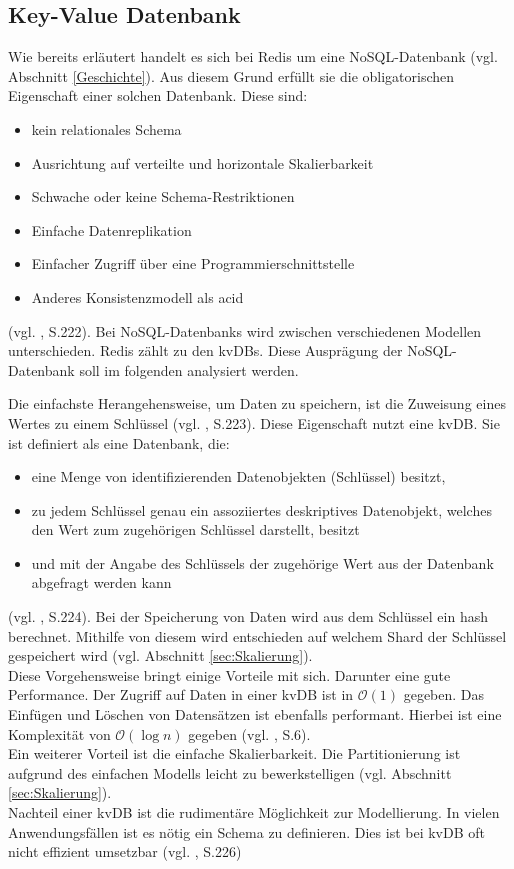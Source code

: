 
\subsection{Key-Value Datenbank}
Wie bereits erläutert handelt es sich bei \acs{Redis} um eine \acs{NoSQL-Datenbank} (vgl. Abschnitt \ref{Geschichte}). Aus diesem Grund erfüllt sie die obligatorischen Eigenschaft einer solchen Datenbank. Diese sind: 
\begin{itemize}
	\item kein relationales Schema
	\item Ausrichtung auf verteilte und horizontale Skalierbarkeit 
	\item Schwache oder keine Schema-Restriktionen 
	\item Einfache Datenreplikation 
	\item Einfacher Zugriff über eine Programmierschnittstelle
	\item Anderes Konsistenzmodell als \gls{acid}
\end{itemize}
(vgl. \cite{1}, S.222). Bei \acp{NoSQL-Datenbank} wird zwischen verschiedenen Modellen unterschieden. \acs{Redis} zählt zu den \glspl{kvDB}. Diese Ausprägung der \acs{NoSQL-Datenbank} soll im folgenden analysiert werden. 

Die einfachste Herangehensweise, um Daten zu speichern, ist die Zuweisung eines Wertes zu einem Schlüssel (vgl. \cite{1}, S.223). Diese Eigenschaft nutzt eine \gls{kvDB}. Sie ist definiert als eine Datenbank, die:
\begin{itemize}
	\item  eine Menge von identifizierenden Datenobjekten (Schlüssel) besitzt,
	\item  zu jedem Schlüssel genau ein assoziiertes deskriptives Datenobjekt, welches den Wert zum zugehörigen Schlüssel darstellt, besitzt
	\item und mit der Angabe des Schlüssels der zugehörige Wert aus der Datenbank abgefragt werden kann
\end{itemize}
(vgl. \cite{1}, S.224). Bei der Speicherung von Daten wird aus dem Schlüssel ein \gls{hash} berechnet. Mithilfe von diesem wird entschieden auf welchem Shard der Schlüssel gespeichert wird (vgl. Abschnitt \ref{sec:Skalierung}).
\\Diese Vorgehensweise bringt einige Vorteile mit sich. Darunter eine gute Performance. Der Zugriff auf Daten in einer \gls{kvDB} ist in $\mathcal{O}(1)$ gegeben. Das Einfügen und Löschen von Datensätzen ist ebenfalls performant. Hierbei ist eine Komplexität von $\mathcal{O}(\log{}n)$ gegeben (vgl. \cite{keyValueComp}, S.6). 
\\Ein weiterer Vorteil ist die einfache Skalierbarkeit. Die Partitionierung ist aufgrund des einfachen Modells leicht zu bewerkstelligen (vgl. Abschnitt \ref{sec:Skalierung}).
\\Nachteil einer \gls{kvDB} ist die rudimentäre Möglichkeit zur Modellierung. In vielen Anwendungsfällen ist es nötig ein Schema zu definieren. Dies ist bei \gls{kvDB} oft nicht effizient umsetzbar (vgl. \cite{1}, S.226)